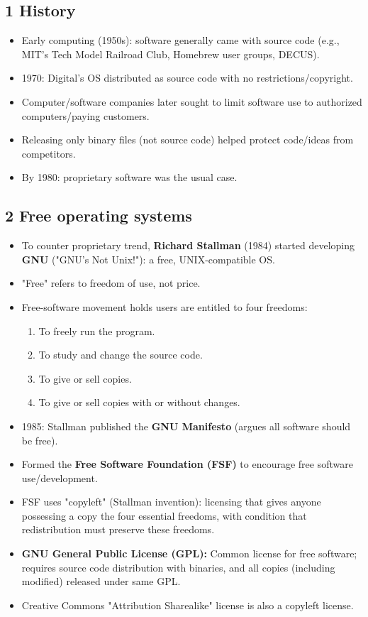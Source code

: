 \documentclass{article}
\begin{document}
\subsection*{1 History}
\begin{itemize}
    \item Early computing (1950s): software generally came with source code (e.g., MIT's Tech Model Railroad Club, Homebrew user groups, DECUS).
    \item 1970: Digital's OS distributed as source code with no restrictions/copyright.
    \item Computer/software companies later sought to limit software use to authorized computers/paying customers.
    \item Releasing only binary files (not source code) helped protect code/ideas from competitors.
    \item By 1980: proprietary software was the usual case.
\end{itemize}

\subsection*{2 Free operating systems}
\begin{itemize}
    \item To counter proprietary trend, \textbf{Richard Stallman} (1984) started developing \textbf{GNU} ("GNU's Not Unix!"): a free, UNIX-compatible OS.
    \item "Free" refers to freedom of use, not price.
    \item Free-software movement holds users are entitled to four freedoms:
    \begin{enumerate}
        \item To freely run the program.
        \item To study and change the source code.
        \item To give or sell copies.
        \item To give or sell copies with or without changes.
    \end{enumerate}
    \item 1985: Stallman published the \textbf{GNU Manifesto} (argues all software should be free).
    \item Formed the \textbf{Free Software Foundation (FSF)} to encourage free software use/development.
    \item FSF uses "copyleft" (Stallman invention): licensing that gives anyone possessing a copy the four essential freedoms, with condition that redistribution must preserve these freedoms.
    \item \textbf{GNU General Public License (GPL):} Common license for free software; requires source code distribution with binaries, and all copies (including modified) released under same GPL.
    \item Creative Commons "Attribution Sharealike" license is also a copyleft license.
\end{itemize}
\end{document}
